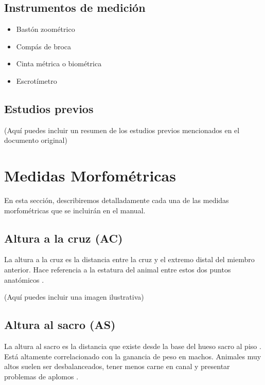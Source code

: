 \documentclass[
]{book}
\providecommand{\tightlist}{%
  \setlength{\itemsep}{0pt}\setlength{\parskip}{0pt}}
\begin{document}
\section{Instrumentos de medición}\label{instrumentos-de-mediciuxf3n}

\begin{itemize}
\tightlist
\item
  Bastón zoométrico
\item
  Compás de broca
\item
  Cinta métrica o biométrica
\item
  Escrotímetro
\end{itemize}

\section{Estudios previos}\label{estudios-previos}

(Aquí puedes incluir un resumen de los estudios previos mencionados en el documento original)

\chapter{Medidas Morfométricas}\label{medidas-morfomuxe9tricas}

En esta sección, describiremos detalladamente cada una de las medidas morfométricas que se incluirán en el manual.

\section{Altura a la cruz (AC)}\label{altura-a-la-cruz-ac}

La altura a la cruz es la distancia entre la cruz y el extremo distal del miembro anterior. Hace referencia a la estatura del animal entre estos dos puntos anatómicos \citep{Estrada2009}.

(Aquí puedes incluir una imagen ilustrativa)

\section{Altura al sacro (AS)}\label{altura-al-sacro-as}

La altura al sacro es la distancia que existe desde la base del hueso sacro al piso \citep{Vargas}. Está altamente correlacionado con la ganancia de peso en machos. Animales muy altos suelen ser desbalanceados, tener menos carne en canal y presentar problemas de aplomos \citep{Estrada2009}.
\end{document}
